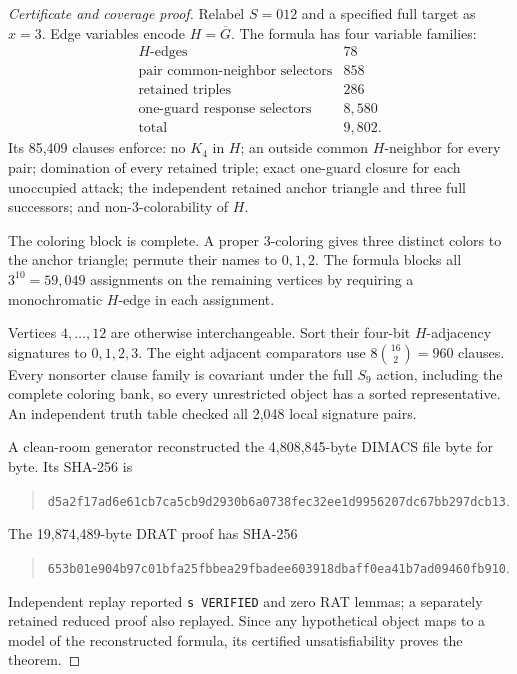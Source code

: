 \documentclass[11pt]{article}
\theoremstyle{definition}
\theoremstyle{remark}
\newcommand{\filehash}[1]{\nolinkurl{#1}}
\begin{document}
\begin{proof}[Certificate and coverage proof]
Relabel \(S=012\) and a specified full target as \(x=3\).  Edge variables
encode \(H=\overline G\).  The formula has four variable families:
\[
\begin{array}{l|r}
H\text{-edges}&78\\
\text{pair common-neighbor selectors}&858\\
\text{retained triples}&286\\
\text{one-guard response selectors}&8,580\\ \hline
\text{total}&9,802.
\end{array}
\tag{4.1}
\]
Its 85,409 clauses enforce: no \(K_4\) in \(H\); an outside common
\(H\)-neighbor for every pair; domination of every retained triple; exact
one-guard closure for each unoccupied attack; the independent retained
anchor triangle and three full successors; and non-3-colorability of
\(H\).

The coloring block is complete.  A proper 3-coloring gives three distinct
colors to the anchor triangle; permute their names to \(0,1,2\).  The
formula blocks all \(3^{10}=59,049\) assignments on the remaining
vertices by requiring a monochromatic \(H\)-edge in each assignment.

Vertices \(4,\ldots,12\) are otherwise interchangeable.  Sort their
four-bit \(H\)-adjacency signatures to \(0,1,2,3\).  The eight adjacent
comparators use \(8\binom{16}{2}=960\) clauses.  Every nonsorter clause
family is covariant under the full \(S_9\) action, including the complete
coloring bank, so every unrestricted object has a sorted representative.
An independent truth table checked all 2,048 local signature pairs.

A clean-room generator reconstructed the 4,808,845-byte DIMACS file byte
for byte.  Its SHA-256 is
\begin{quote}\small
\filehash{d5a2f17ad6e61cb7ca5cb9d2930b6a0738fec32ee1d9956207dc67bb297dcb13}.
\end{quote}
The 19,874,489-byte DRAT proof has SHA-256
\begin{quote}\small
\filehash{653b01e904b97c01bfa25fbbea29fbadee603918dbaff0ea41b7ad09460fb910}.
\end{quote}
Independent replay reported \texttt{s VERIFIED} and zero RAT lemmas; a
separately retained reduced proof also replayed.  Since any hypothetical
object maps to a model of the reconstructed formula, its certified
unsatisfiability proves the theorem.
\end{proof}
\end{document}
